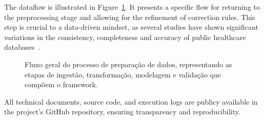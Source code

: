\documentclass[sigconf,natbib=false]{acmart}
\begin{document}

The dataflow is illustrated in Figure~\ref{fig:dataflow}. It presents a specific flow for returning to the preprocessing stage and allowing for the refinement of correction rules.
This step is crucial to a data-driven mindset, as several studies have shown significant variations in the consistency, completeness and accuracy of public healthcare databases~\cite{iken2024}.




\begin{figure}[h!]
    \centering
    
    \caption{Fluxo geral do processo de preparação de dados, representando as etapas de ingestão, transformação, modelagem e validação que compõem o framework.}
    \label{fig:dataflow}
\end{figure}

All technical documents, source code, and execution logs are publicy available in the project's GitHub repository, ensuring transparency and reproducibility.


\end{document}
